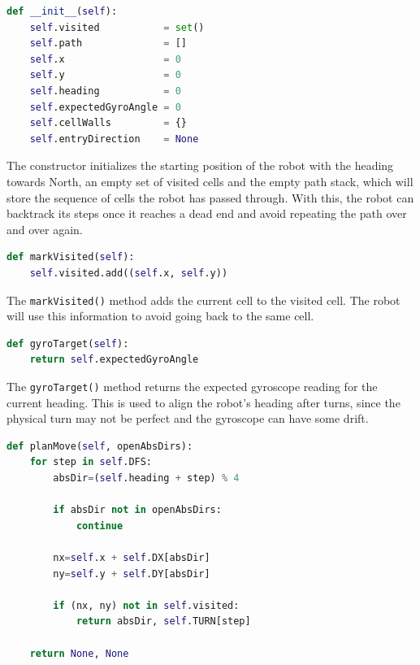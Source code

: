 \begin{lstlisting}[language=Python, caption={MazeMap constructor}, label={lst:lk-init}]
def __init__(self):
    self.visited           = set()
    self.path              = []      
    self.x                 = 0
    self.y                 = 0
    self.heading           = 0       
    self.expectedGyroAngle = 0
    self.cellWalls         = {}
    self.entryDirection    = None 
\end{lstlisting}

The constructor initializes the starting position of the robot with the heading towards North, an empty set of visited cells and the empty path stack, which will store the sequence of cells the robot has passed through. With this, the robot can backtrack its steps once it reaches a dead end and avoid repeating the path over and over again. 

\begin{lstlisting}[language=Python, caption={MazeMap visit method}, label={lst:lk-init}]
def markVisited(self):
    self.visited.add((self.x, self.y))
\end{lstlisting}

The \texttt{markVisited()} method adds the current cell to the visited cell. The robot will use this information to avoid going back to the same cell.

\begin{lstlisting}[language=Python, caption={MazeMap gyro target}, label={lst:lk-init}]
def gyroTarget(self):
    return self.expectedGyroAngle
\end{lstlisting}

The \texttt{gyroTarget()} method returns the expected gyroscope reading for the current heading. This is used to align the robot’s heading after turns, since the physical turn may not be perfect and the gyroscope can have some drift.

\begin{lstlisting}[language=Python, caption={MazeMap plan move method}, label={lst:lk-init}]
def planMove(self, openAbsDirs):
    for step in self.DFS:
        absDir=(self.heading + step) % 4
        
        if absDir not in openAbsDirs:
            continue
        
        nx=self.x + self.DX[absDir]
        ny=self.y + self.DY[absDir]
        
        if (nx, ny) not in self.visited:
            return absDir, self.TURN[step]
        
    return None, None
\end{lstlisting}

